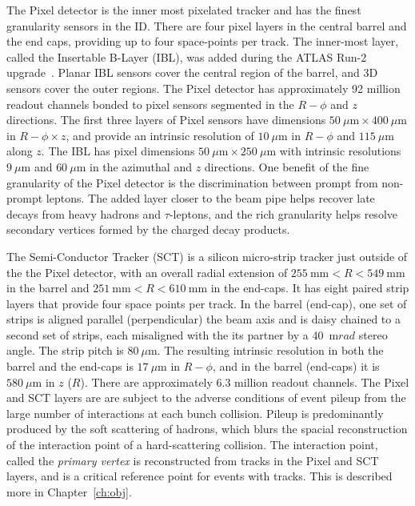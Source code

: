 The Pixel detector is the inner most pixelated tracker and has the finest granularity sensors in the ID.  There are four pixel layers in the central barrel and the end caps, providing up to four space-points per track.  The inner-most layer, called the Insertable B-Layer (IBL), was added during the ATLAS Run-2 upgrade~\cite{Takubo:2014qsa}.  Planar IBL sensors cover the central region of the barrel, and 3D sensors cover the outer regions.  The Pixel detector has approximately 92 million readout channels bonded to pixel sensors segmented in the $R-\phi$ and $z$ directions.  The first three layers of Pixel sensors have dimensions $50~\mu \mathrm{m} \times 400~\mu \mathrm{m}$ in $R-\phi \times z$, and provide an intrinsic resolution of $10~\mu \mathrm{m}$ in $R-\phi$ and $115~\mu \mathrm{m}$ along $z$.  The IBL has pixel dimensions $50~\mu \mathrm{m} \times 250~\mu \mathrm{m}$ with intrinsic resolutions $9~\mu \mathrm{m}$ and $60~\mu \mathrm{m}$ in the azimuthal and $z$ directions.  One benefit of the fine granularity of the Pixel detector is the discrimination between prompt from non-prompt leptons.  The added layer closer to the beam pipe helps recover late decays from heavy hadrons and $\tau$-leptons, and the rich granularity helps resolve secondary vertices formed by the charged decay products. 

The Semi-Conductor Tracker (SCT) is a silicon micro-strip tracker just outside of the the Pixel detector, with an overall radial extension of $255~\mathrm{mm} < R < 549~\mathrm{mm}$ in the barrel and $251~\mathrm{mm} < R < 610~\mathrm{mm}$ in the end-caps.  It has eight paired strip layers that provide four space points per track.  In the barrel (end-cap), one set of strips is aligned parallel (perpendicular) the beam axis and is daisy chained to a second set of strips, each misaligned with the its partner by a 40~$\mathrm{m}rad$ stereo angle\cite{Abdesselam:2006wt}.  The strip pitch is $80~\mu \mathrm{m}$.  The resulting intrinsic resolution in both the barrel and the end-caps is $17~\mu \mathrm{m}$ in  $R-\phi$, and in the barrel (end-caps) it is $580~\mu \mathrm{m}$ in $z$ ($R$).  There are approximately 6.3 million readout channels.  The Pixel and SCT layers are are subject to the adverse conditions of event pileup from the large number of interactions at each bunch collision.  Pileup is predominantly produced by the soft scattering of hadrons, which blurs the spacial reconstruction of the interaction point of a hard-scattering collision.  The interaction point, called the \textit{primary vertex} is reconstructed from tracks in the Pixel and SCT layers, and is a critical reference point for events with tracks.  This is described more in Chapter~\ref{ch:obj}.

